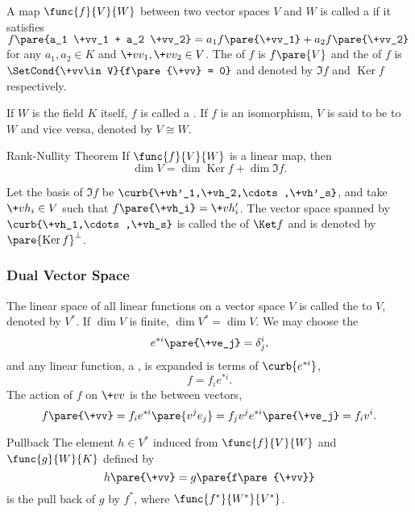 \documentclass[hidelinks]{article}
\DeclareMathOperator{\Ker}{Ker}
\begin{document}
A map $\func{f}{V}{W}$ between two vector spaces $V$ and $W$ is called a  if it satisfies $f\pare{a_1 \+vv_1 + a_2 \+vv_2} = a_1f\pare{\+vv_1} + a_2 f\pare{\+vv_2}$ for any $a_1,a_2 \in K$ and $\+vv_1, \+vv_2 \in V$. The  of $f$ is $f\pare{V}$ and the  of $f$ is $\SetCond{\+vv\in V}{f\pare{\+vv} = 0}$ and denoted by $\Im f$ and $\Ker f$ respectively.
\par
If $W$ is the field $K$ itself, $f$ is called a . If $f$ is an isomorphism, $V$ is said to be  to $W$ and vice versa, denoted by $V\cong W$.
\begin{finaleq}[\baselineskip]{Rank-Nullity Theorem}
    If $\func{f}{V}{W}$ is a linear map, then
    \[ \dim V = \dim \Ker f + \dim \Im f. \]
\end{finaleq}
Let the basis of $\Im f$ be $\curb{\+vh'_1,\+vh_2,\cdots,\+vh'_s}$, and take $\+vh_i\in V$ such that $f\pare{\+vh_i} = \+vh'_i$. The vector space spanned by $\curb{\+vh_1,\cdots,\+vh_s}$ is called the  of $\Ket f$ and is denoted by $\pare{\Ker f}^{\perp}$.


\subsubsection{Dual Vector Space} %
\label{ssub:dual_vector_space}

The linear space of all linear functions on a vector space $V$ is called the  to $V$, denoted by $V^*$. If $\dim V$ is finite, $\dim V^* = \dim V$. We may choose the 
\[ e^{*i}\pare{\+ve_j} = \delta^i_j, \]
and any linear function, a , is expanded is terms of $\curb{e^{*i}}$,
\[ f = f_i e^{*i}. \]
The action of $f$ on $\+vv$ is the  between vectors,
\[ f\pare{\+vv} = f_i e^{*i}\pare{v^j e_j} = f_jv^j e^{*i}\pare{\+ve_j} = f_iv^i. \]
\vspace{-\baselineskip}
\begin{termdef}{Pullback}
    The element $h\in V^*$ induced from $\func{f}{V}{W}$ and $\func{g}{W}{K}$ defined by
    \[ h\pare{\+vv} = g\pare{f\pare{\+vv}} \]
    is the pull back of $g$ by $f^*$, where $\func{f^*}{W^*}{V^*}$.
\end{termdef}

\end{document}
